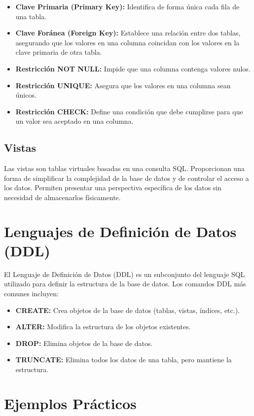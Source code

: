 \begin{itemize}
    \item \textbf{Clave Primaria (Primary Key):} Identifica de forma única cada fila de una tabla.
    \item \textbf{Clave Foránea (Foreign Key):} Establece una relación entre dos tablas, asegurando que los valores en una columna coincidan con los valores en la clave primaria de otra tabla.
    \item \textbf{Restricción NOT NULL:}  Impide que una columna contenga valores nulos.
    \item \textbf{Restricción UNIQUE:} Asegura que los valores en una columna sean únicos.
    \item \textbf{Restricción CHECK:} Define una condición que debe cumplirse para que un valor sea aceptado en una columna.
\end{itemize}

\subsection{Vistas}

Las vistas son tablas virtuales basadas en una consulta SQL.  Proporcionan una forma de simplificar la complejidad de la base de datos y de controlar el acceso a los datos. Permiten presentar una perspectiva específica de los datos sin necesidad de almacenarlos físicamente.

\section{Lenguajes de Definición de Datos (DDL)}

El Lenguaje de Definición de Datos (DDL) es un subconjunto del lenguaje SQL utilizado para definir la estructura de la base de datos.  Los comandos DDL más comunes incluyen:

\begin{itemize}
    \item \textbf{CREATE:} Crea objetos de la base de datos (tablas, vistas, índices, etc.).
    \item \textbf{ALTER:} Modifica la estructura de los objetos existentes.
    \item \textbf{DROP:} Elimina objetos de la base de datos.
    \item \textbf{TRUNCATE:} Elimina todos los datos de una tabla, pero mantiene la estructura.
\end{itemize}

\section{Ejemplos Prácticos}

